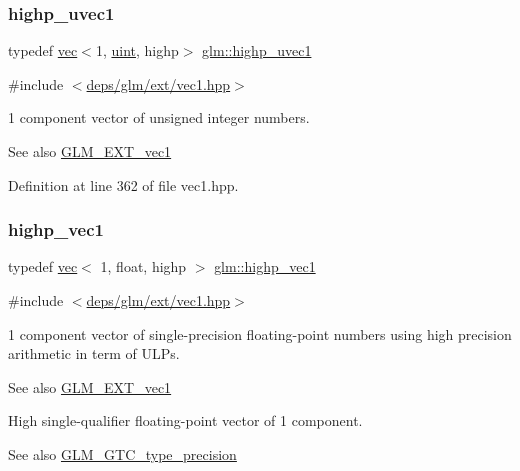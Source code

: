 \subsubsection{\texorpdfstring{highp\+\_\+uvec1}{highp\_uvec1}}
{\footnotesize\ttfamily typedef \hyperlink{structglm_1_1vec}{vec}$<$1, \hyperlink{group__core__precision_ga4fd29415871152bfb5abd588334147c8}{uint}, highp$>$ \hyperlink{group__ext__vec1_ga4e92a1105fa908e8a96971602381e381}{glm\+::highp\+\_\+uvec1}}



{\ttfamily \#include $<$\hyperlink{ext_2vec1_8hpp}{deps/glm/ext/vec1.\+hpp}$>$}

1 component vector of unsigned integer numbers.

\begin{DoxySeeAlso}{See also}
\hyperlink{group__ext__vec1}{G\+L\+M\+\_\+\+E\+X\+T\+\_\+vec1} 
\end{DoxySeeAlso}


Definition at line 362 of file vec1.\+hpp.

\mbox{\label{group__ext__vec1_gad8ebf6f2ad36cc3167e77f82b4ae9390}} 
\subsubsection{\texorpdfstring{highp\+\_\+vec1}{highp\_vec1}}
{\footnotesize\ttfamily typedef \hyperlink{structglm_1_1vec}{vec}$<$ 1, float, highp $>$ \hyperlink{group__ext__vec1_gad8ebf6f2ad36cc3167e77f82b4ae9390}{glm\+::highp\+\_\+vec1}}



{\ttfamily \#include $<$\hyperlink{ext_2vec1_8hpp}{deps/glm/ext/vec1.\+hpp}$>$}

1 component vector of single-\/precision floating-\/point numbers using high precision arithmetic in term of U\+L\+Ps.

\begin{DoxySeeAlso}{See also}
\hyperlink{group__ext__vec1}{G\+L\+M\+\_\+\+E\+X\+T\+\_\+vec1}
\end{DoxySeeAlso}
High single-\/qualifier floating-\/point vector of 1 component. \begin{DoxySeeAlso}{See also}
\hyperlink{group__gtc__type__precision}{G\+L\+M\+\_\+\+G\+T\+C\+\_\+type\+\_\+precision} 
\end{DoxySeeAlso}


